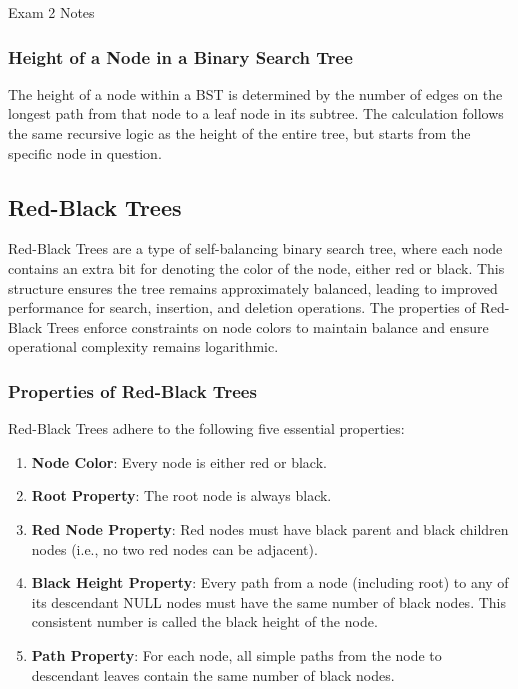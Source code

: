 \begin{examnotes}{Exam 2 Notes}
    \subsubsection*{Height of a Node in a Binary Search Tree}

    The height of a node within a BST is determined by the number of edges on the longest path from that node to a leaf node in its subtree. The calculation follows the same recursive logic as the 
    height of the entire tree, but starts from the specific node in question.

    \subsection*{Red-Black Trees}

    Red-Black Trees are a type of self-balancing binary search tree, where each node contains an extra bit for denoting the color of the node, either red or black. This structure ensures the tree 
    remains approximately balanced, leading to improved performance for search, insertion, and deletion operations. The properties of Red-Black Trees enforce constraints on node colors to maintain 
    balance and ensure operational complexity remains logarithmic.
    
    \subsubsection*{Properties of Red-Black Trees}
    
    Red-Black Trees adhere to the following five essential properties:
    
    \begin{enumerate}
        \item \textbf{Node Color}: Every node is either red or black.
        \item \textbf{Root Property}: The root node is always black.
        \item \textbf{Red Node Property}: Red nodes must have black parent and black children nodes (i.e., no two red nodes can be adjacent).
        \item \textbf{Black Height Property}: Every path from a node (including root) to any of its descendant NULL nodes must have the same number of black nodes. This consistent number is called 
        the black height of the node.
        \item \textbf{Path Property}: For each node, all simple paths from the node to descendant leaves contain the same number of black nodes.
    \end{enumerate}
    

\end{examnotes}

